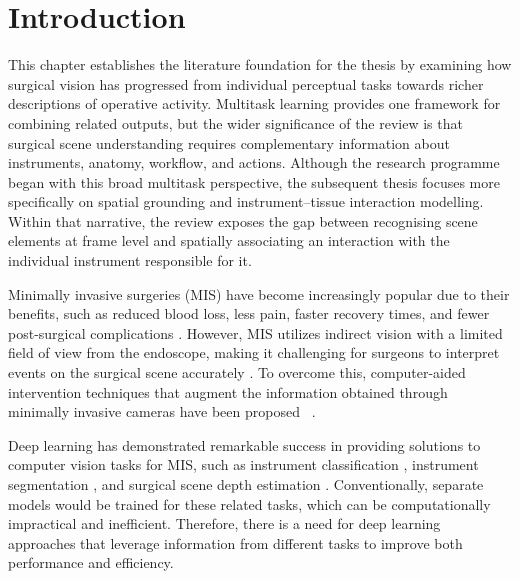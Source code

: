 \section{Introduction}  \label{sec::introduction}

This chapter establishes the literature foundation for the thesis by examining how surgical vision has progressed from individual perceptual tasks towards richer descriptions of operative activity. Multitask learning provides one framework for combining related outputs, but the wider significance of the review is that surgical scene understanding requires complementary information about instruments, anatomy, workflow, and actions. Although the research programme began with this broad multitask perspective, the subsequent thesis focuses more specifically on spatial grounding and instrument--tissue interaction modelling. Within that narrative, the review exposes the gap between recognising scene elements at frame level and spatially associating an interaction with the individual instrument responsible for it.

Minimally invasive surgeries (MIS)
have become increasingly popular due to their benefits, such as reduced blood loss, less pain, faster recovery times, and fewer post-surgical complications \citep{jaffray2005minimally}. However, MIS utilizes indirect vision with a limited field of view from the endoscope, making it challenging for surgeons to interpret events on the surgical scene accurately  \citep{real_time_seg_adverserial}. To overcome this, computer-aided intervention techniques that augment the information obtained through minimally invasive cameras have been proposed ~\citep{vecauteren_cai_4_cai,cv_in_surgery}.

Deep learning has demonstrated remarkable success in providing solutions to computer vision tasks for MIS, such as instrument classification \citep{wang2017deep,mishra2017learning,al2018monitoring}, instrument segmentation \citep{garcia2017toolnet,milletari2018cfcm,pakhomov2020searching,real_time_seg_adverserial}, and surgical scene depth estimation \citep{luo2019details,xiao2020depth,wei2022stereo,luo2022unsupervised}. Conventionally, separate models would be trained for these related tasks, which can be computationally impractical and inefficient. Therefore, there is a need for deep learning approaches that leverage information from different tasks to improve both performance and efficiency.

